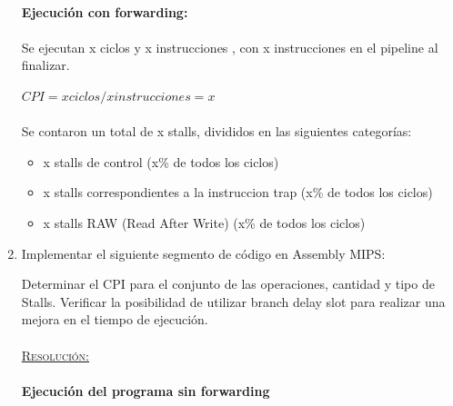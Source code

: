 \documentclass[a4paper,11pt]{article}
\begin{document}
\begin{enumerate}
\paragraph{Ejecuci\'on con forwarding:}

\paragraph{}
Se ejecutan x ciclos y x instrucciones , con x instrucciones en el  pipeline al finalizar.

\begin{center}
$CPI = x ciclos / x instrucciones = x$
\end{center}


\paragraph{} 
Se contaron un total de x stalls, divididos en las siguientes categor\'ias:

\begin{itemize}
 \item x stalls de control (x\% de todos los ciclos)
 \item x stalls correspondientes a la instruccion trap (x\% de todos los ciclos)
 \item x  stalls RAW (Read After Write) (x\% de todos los ciclos)
\end{itemize}


\newpage
\item Implementar el siguiente segmento de c\'odigo en Assembly MIPS:


\lstset{language=c,basicstyle=\small,showstringspaces=false,columns=fullflexible,frame=lines,tabsize=4,inputencoding=latin1,extendedchars=true}


Determinar el CPI para el conjunto de las operaciones, cantidad y tipo de Stalls. Verificar la posibilidad de utilizar branch delay slot para realizar una mejora en el tiempo de ejecuci\'on.

\paragraph{}
\underline{\textsc{Resoluci\'on:}}


\paragraph{Ejecuci\'on del programa sin forwarding}



\end{enumerate}
\end{document}
